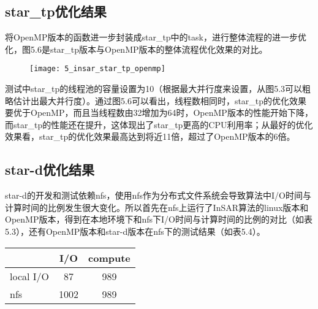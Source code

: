 \subsection{star\_tp优化结果}

将OpenMP版本的函数进一步封装成star\_tp中的task，进行整体流程的进一步优化，图5.6是star\_tp版本与OpenMP版本的整体流程优化效果的对比。

\begin{figure}[!htbp]
    \centering
    \texttt{[image: 5\_insar\_star\_tp\_openmp]}
    \label{fig:5_insar_star_tp_openmp}
\end{figure}

测试中star\_tp的线程池的容量设置为10（根据最大并行度来设置，从图5.3可以粗略估计出最大并行度）。通过图5.6可以看出，线程数相同时，star\_tp的优化效果要优于OpenMP，而且当线程数由32增加为64时，OpenMP版本的性能开始下降，而star\_tp的性能还在提升，这体现出了star\_tp更高的CPU利用率；从最好的优化效果看，star\_tp的优化效果最高达到将近11倍，超过了OpenMP版本的6倍。

\subsection{star-d优化结果}

star-d的开发和测试依赖nfs，使用nfs作为分布式文件系统会导致算法中I/O时间与计算时间的比例发生很大变化。所以首先在nfs上运行了InSAR算法的linux版本和OpenMP版本，得到在本地环境下和nfs下I/O时间与计算时间的比例的对比（如表5.3），还有OpenMP版本和star-d版本在nfs下的测试结果（如表5.4）。

\begin{table}[!htbp]
    \label{tab:5_insar_openmp_result}
    \centering
    \footnotesize
    \setlength{\tabcolsep}{4pt}
    \renewcommand{\arraystretch}{1.2} 
    \begin{tabular}{|l|c|c|}
        \hline
        			&   I/O		& 	compute	\\ \hline
		local I/O	&   87		&   989		\\ \hline
		nfs			&	1002	&   989		\\ \hline
    \end{tabular}
\end{table}

